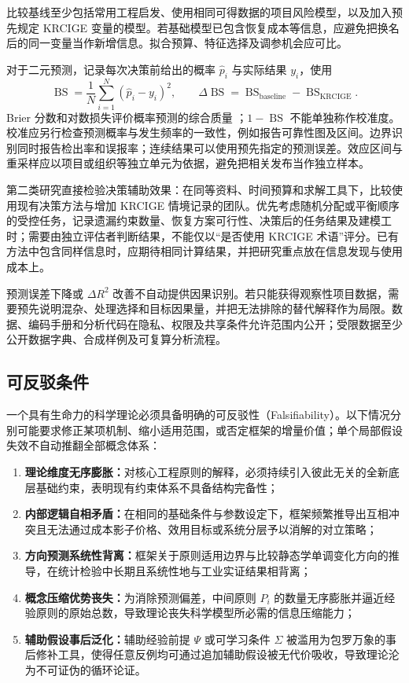 \documentclass[11pt,a4paper]{ctexart}
\numberwithin{equation}{section}
\theoremstyle{definition}
\theoremstyle{plain}
\begin{document}
比较基线至少包括常用工程启发、使用相同可得数据的项目风险模型，以及加入预先规定 KRCIGE 变量的模型。若基础模型已包含恢复成本等信息，应避免把换名后的同一变量当作新增信息。拟合预算、特征选择及调参机会应可比。

对于二元预测，记录每次决策前给出的概率 $\hat p_i$ 与实际结果 $y_i$，使用
\[
\operatorname{BS}=\frac1N\sum_{i=1}^{N}(\hat p_i-y_i)^2,\qquad
\Delta\operatorname{BS}
=\operatorname{BS}_{\mathrm{baseline}}-\operatorname{BS}_{\mathrm{KRCIGE}}.
\]
Brier 分数和对数损失评价概率预测的综合质量 \cite{gneiting2007}；$1-\operatorname{BS}$ 不能单独称作校准度。校准应另行检查预测概率与发生频率的一致性，例如报告可靠性图及区间。边界识别同时报告检出率和误报率；连续结果可以使用预先指定的预测误差。效应区间与重采样应以项目或组织等独立单元为依据，避免把相关发布当作独立样本。

第二类研究直接检验决策辅助效果：在同等资料、时间预算和求解工具下，比较使用现有决策方法与增加 KRCIGE 情境记录的团队。优先考虑随机分配或平衡顺序的受控任务，记录遗漏约束数量、恢复方案可行性、决策后的任务结果及建模工时；需要由独立评估者判断结果，不能仅以“是否使用 KRCIGE 术语”评分。已有方法中包含同样信息时，应期待相同计算结果，并把研究重点放在信息发现与使用成本上。

预测误差下降或 $\Delta R^2$ 改善不自动提供因果识别。若只能获得观察性项目数据，需要预先说明混杂、处理选择和目标因果量，并把无法排除的替代解释作为局限。数据、编码手册和分析代码在隐私、权限及共享条件允许范围内公开；受限数据至少公开数据字典、合成样例及可复算分析流程。

\subsection{可反驳条件}

一个具有生命力的科学理论必须具备明确的可反驳性（Falsifiability）。以下情况分别可能要求修正某项机制、缩小适用范围，或否定框架的增量价值；单个局部假设失效不自动推翻全部概念体系：

\begin{enumerate}
    \item \textbf{理论维度无序膨胀：}对核心工程原则的解释，必须持续引入彼此无关的全新底层基础约束，表明现有约束体系不具备结构完备性；
    \item \textbf{内部逻辑自相矛盾：}在相同的基础条件与参数设定下，框架频繁推导出互相冲突且无法通过成本影子价格、效用目标或系统分层予以消解的对立策略；
    \item \textbf{方向预测系统性背离：}框架关于原则适用边界与比较静态学单调变化方向的推导，在统计检验中长期且系统性地与工业实证结果相背离；
    \item \textbf{概念压缩优势丧失：}为消除预测偏差，中间原则 $P_i$ 的数量无序膨胀并逼近经验原则的原始总数，导致理论丧失科学模型所必需的信息压缩能力；
    \item \textbf{辅助假设事后泛化：}辅助经验前提 $\Psi$ 或可学习条件 $\Sigma$ 被滥用为包罗万象的事后修补工具，使得任意反例均可通过追加辅助假设被无代价吸收，导致理论沦为不可证伪的循环论证。
\end{enumerate}
\end{document}
